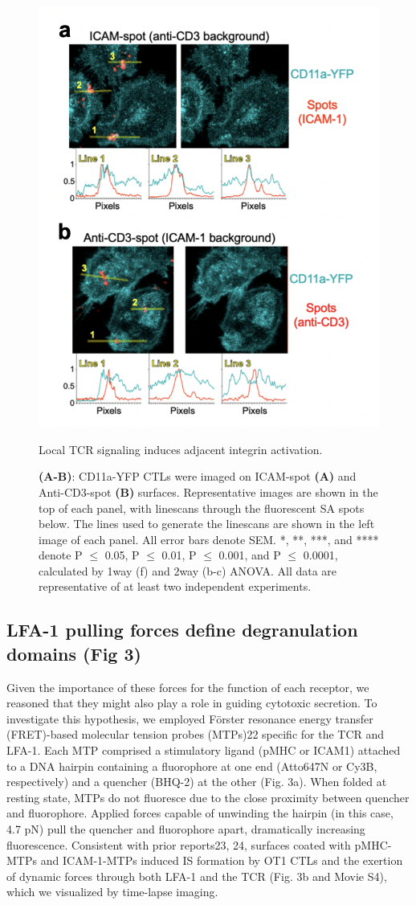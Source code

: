 \begin{figure}[htbp]
	\centering
	\includegraphics[width=0.8\columnwidth]{../figures/chapter3/fig2yfp.png}
	\caption{Local TCR signaling induces adjacent integrin activation.}
	\caption*{\textbf{(A-B)}: CD11a-YFP CTLs were imaged on ICAM-spot \textbf{(A)} and Anti-CD3-spot \textbf{(B)} surfaces. Representative images are shown in the top of each panel, with linescans through the fluorescent SA spots below. The lines used to generate the linescans are shown in the left image of each panel. All error bars denote SEM. *, **, ***, and **** denote P $\leq$ 0.05, P $\leq$ 0.01, P $\leq$ 0.001, and P $\leq$ 0.0001, calculated by 1way
(f) and 2way (b-c) ANOVA. All data are representative of at least two independent experiments.}
	\label{fig:fig2yfp}
\end{figure}

\subsection{LFA-1 pulling forces define degranulation domains (Fig 3)}
Given the importance of these forces for the function of each receptor, we reasoned that they might also play a role in guiding cytotoxic secretion. To investigate this hypothesis, we employed F\"{o}rster resonance energy transfer (FRET)-based molecular tension probes (MTPs)22 specific for the TCR and LFA-1. Each MTP comprised a stimulatory ligand (pMHC or ICAM1) attached to a DNA hairpin containing a fluorophore at one end (Atto647N or Cy3B, respectively) and a quencher (BHQ-2) at the other (Fig. 3a). When folded at resting state, MTPs do not fluoresce due to the close proximity between quencher and fluorophore. Applied forces capable of unwinding the hairpin (in this case, 4.7 pN) pull the quencher and fluorophore apart, dramatically increasing fluorescence. Consistent with prior reports23, 24, surfaces coated with pMHC-MTPs and ICAM-1-MTPs induced IS formation by OT1 CTLs and the exertion of dynamic forces through both LFA-1 and the TCR (Fig. 3b and Movie S4), which we visualized by time-lapse imaging. 

